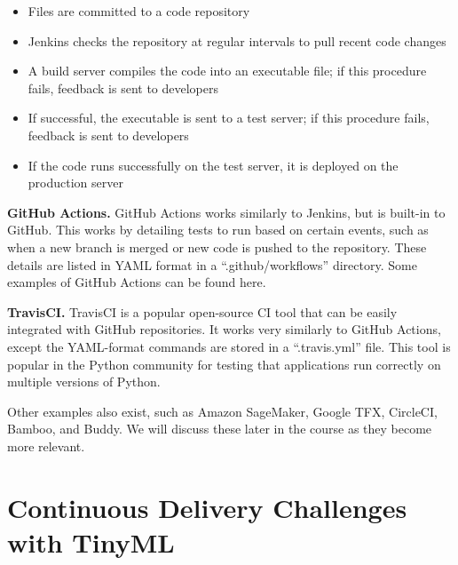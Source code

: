 {{{{    \begin{itemize}
      \item Files are committed to a code repository
      \item Jenkins checks the repository at regular intervals to pull recent code changes
      \item A build server compiles the code into an executable file; if this procedure fails, feedback is sent to developers
      \item If successful, the executable is sent to a test server; if this procedure fails, feedback is sent to developers
      \item If the code runs successfully on the test server, it is deployed on the production server
    \end{itemize}
    
    \textbf{GitHub Actions.} GitHub Actions works similarly to Jenkins, but is built-in to GitHub. This works by detailing tests to run based on certain events, such as when a new branch is merged or new code is pushed to the repository. These details are listed in YAML format in a “.github/workflows” directory. Some examples of GitHub Actions can be found here.
    
   \textbf{TravisCI.} TravisCI is a popular open-source CI tool that can be easily integrated with GitHub repositories. It works very similarly to GitHub Actions, except the YAML-format commands are stored in a “.travis.yml” file. This tool is popular in the Python community for testing that applications run correctly on multiple versions of Python.
    
    Other examples also exist, such as Amazon SageMaker, Google TFX, CircleCI, Bamboo, and Buddy. We will discuss these later in the course as they become more relevant.
    
\section{Continuous Delivery Challenges with TinyML}

}}}}
